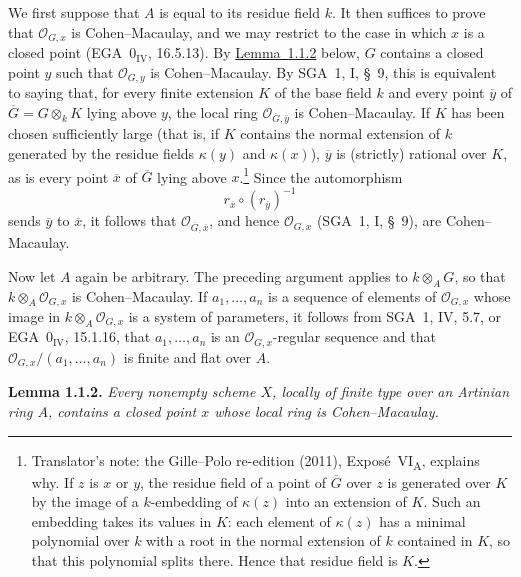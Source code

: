 \medskip
We first suppose that \(A\) is equal to its residue field \(k\). It then
suffices to prove that \(\mathcal O_{G,x}\) is Cohen--Macaulay, and we may
restrict to the case in which \(x\) is a closed point
(EGA~\(0_{\mathrm{IV}}\), 16.5.13). By
\hyperref[lem:sga3-VIA-1.1.2]{Lemma~1.1.2} below, \(G\) contains a closed
point \(y\) such that \(\mathcal O_{G,y}\) is Cohen--Macaulay. By
SGA~1, I, \S~9, this is equivalent to saying that, for every finite
extension \(K\) of the base field \(k\) and every point \(\overline y\) of
\(\overline G=G\otimes_k K\) lying above \(y\), the local ring
\(\mathcal O_{\overline G,\overline y}\) is Cohen--Macaulay. If \(K\) has
been chosen sufficiently large (that is, if \(K\) contains the normal
extension of \(k\) generated by the residue fields \(\kappa(y)\) and
\(\kappa(x)\)), \(\overline y\) is (strictly) rational over \(K\), as
is every point \(\overline x\) of \(\overline G\) lying above \(x\).\footnote{Translator's note: the Gille--Polo re-edition (2011),
Exposé~VI\textsubscript{A}, explains why. If \(z\) is \(x\) or \(y\), the residue field of a point of
\(\overline G\) over \(z\) is generated over \(K\) by the image of a \(k\)-embedding of \(\kappa(z)\)
into an extension of \(K\). Such an embedding takes its values in \(K\): each element of \(\kappa(z)\)
has a minimal polynomial over \(k\) with a root in the normal extension of \(k\) contained in \(K\),
so that this polynomial splits there. Hence that residue field is \(K\).}
Since the automorphism
\[
  r_{\overline x}\circ(r_{\overline y})^{-1}
\]
sends \(\overline y\) to \(\overline x\), it follows that
\(\mathcal O_{\overline G,\overline x}\), and hence
\(\mathcal O_{G,x}\) (SGA~1, I, \S~9), are Cohen--Macaulay.

Now let \(A\) again be arbitrary. The preceding argument applies to
\(k\otimes_A G\), so that \(k\otimes_A\mathcal O_{G,x}\) is
Cohen--Macaulay. If \(a_1,\ldots,a_n\) is a sequence of elements of
\(\mathcal O_{G,x}\) whose image in
\(k\otimes_A\mathcal O_{G,x}\) is a system of parameters, it follows from
SGA~1, IV, 5.7, or EGA~\(0_{\mathrm{IV}}\), 15.1.16, that
\(a_1,\ldots,a_n\) is an \(\mathcal O_{G,x}\)-regular sequence and that
\(\mathcal O_{G,x}/(a_1,\ldots,a_n)\) is finite and flat over \(A\).

\medskip
{}\label{lem:sga3-VIA-1.1.2}%
\noindent\textbf{Lemma 1.1.2.}
\textit{Every nonempty scheme \(X\), locally of finite type over an
Artinian ring \(A\), contains a closed point \(x\) whose local ring is
Cohen--Macaulay.}

